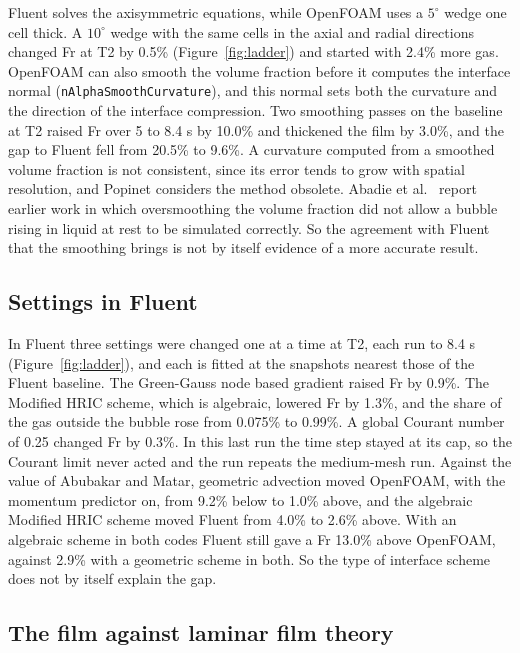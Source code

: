 \documentclass[11pt,a4paper]{article}
\begin{document}
Fluent solves the axisymmetric equations, while OpenFOAM uses a $5^\circ$ wedge one cell thick. A $10^\circ$ wedge with the same cells in the axial and radial directions changed Fr at T2 by 0.5\% (Figure~\ref{fig:ladder}) and started with 2.4\% more gas. OpenFOAM can also smooth the volume fraction before it computes the interface normal (\texttt{nAlphaSmoothCurvature}), and this normal sets both the curvature and the direction of the interface compression. Two smoothing passes on the baseline at T2 raised Fr over 5 to 8.4 s by 10.0\% and thickened the film by 3.0\%, and the gap to Fluent fell from 20.5\% to 9.6\%. A curvature computed from a smoothed volume fraction is not consistent, since its error tends to grow with spatial resolution, and Popinet \cite{popinet2018numerical} considers the method obsolete. Abadie et al.\ \cite{abadie2015combined} report earlier work in which oversmoothing the volume fraction did not allow a bubble rising in liquid at rest to be simulated correctly. So the agreement with Fluent that the smoothing brings is not by itself evidence of a more accurate result.

\subsection{Settings in Fluent}

In Fluent three settings were changed one at a time at T2, each run to 8.4 s (Figure~\ref{fig:ladder}), and each is fitted at the snapshots nearest those of the Fluent baseline. The Green-Gauss node based gradient raised Fr by 0.9\%. The Modified HRIC scheme, which is algebraic, lowered Fr by 1.3\%, and the share of the gas outside the bubble rose from 0.075\% to 0.99\%. A global Courant number of 0.25 changed Fr by 0.3\%. In this last run the time step stayed at its cap, so the Courant limit never acted and the run repeats the medium-mesh run. Against the value of Abubakar and Matar, geometric advection moved OpenFOAM, with the momentum predictor on, from 9.2\% below to 1.0\% above, and the algebraic Modified HRIC scheme moved Fluent from 4.0\% to 2.6\% above. With an algebraic scheme in both codes Fluent still gave a Fr 13.0\% above OpenFOAM, against 2.9\% with a geometric scheme in both. So the type of interface scheme does not by itself explain the gap.

\subsection{The film against laminar film theory}
\label{sec:film}
\end{document}
